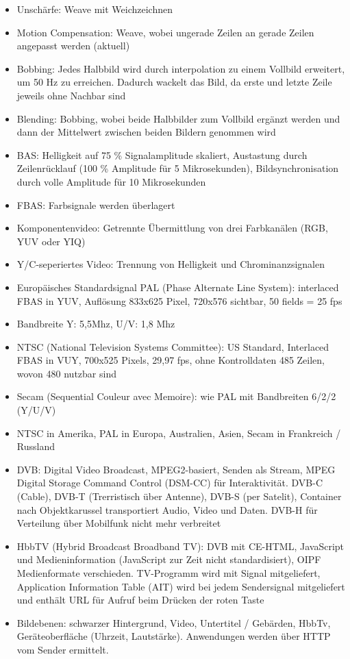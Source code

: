 \documentclass[12pt,landscape]{article}
\begin{document}
\begin{multicols}{3}
\begin{itemize}
\item Unschärfe: Weave mit Weichzeichnen
\item Motion Compensation: Weave, wobei ungerade Zeilen an gerade Zeilen angepasst werden (aktuell)
\item Bobbing: Jedes Halbbild wird durch interpolation zu einem Vollbild erweitert, um 50 Hz zu erreichen. Dadurch wackelt das Bild, da erste und letzte Zeile jeweils ohne Nachbar sind
\item Blending: Bobbing, wobei beide Halbbilder zum Vollbild ergänzt werden und dann der Mittelwert zwischen beiden Bildern genommen wird
\item BAS: Helligkeit auf 75 \% Signalamplitude skaliert, Austastung durch Zeilenrücklauf (100 \% Amplitude für 5 Mikrosekunden), Bildsynchronisation durch volle Amplitude für 10 Mikrosekunden
\item FBAS: Farbsignale werden überlagert
\item Komponentenvideo: Getrennte Übermittlung von drei Farbkanälen (RGB, YUV oder YIQ)
\item Y/C-seperiertes Video: Trennung von Helligkeit und Chrominanzsignalen
\item Europäisches Standardsignal PAL (Phase Alternate Line System): interlaced FBAS in YUV, Auflösung 833x625 Pixel, 720x576 sichtbar, 50 fields = 25 fps
\item Bandbreite Y: 5,5Mhz, U/V: 1,8 Mhz
\item NTSC (National Television Systems Committee): US Standard, Interlaced FBAS in VUY, 700x525 Pixels, 29,97 fps, ohne Kontrolldaten 485 Zeilen, wovon 480 nutzbar sind
\item Secam (Sequential Couleur avec Memoire): wie PAL mit Bandbreiten 6/2/2 (Y/U/V)
\item NTSC in Amerika, PAL in Europa, Australien, Asien, Secam in Frankreich / Russland
\item DVB: Digital Video Broadcast, MPEG2-basiert, Senden als Stream, MPEG Digital Storage Command Control (DSM-CC) für Interaktivität. DVB-C (Cable), DVB-T (Trerristisch über Antenne), DVB-S (per Satelit), Container nach Objektkarussel transportiert Audio, Video und Daten. DVB-H für Verteilung über Mobilfunk nicht mehr verbreitet
\item HbbTV (Hybrid Broadcast Broadband TV): DVB mit CE-HTML, JavaScript und Medieninformation (JavaScript zur Zeit nicht standardisiert), OIPF Medienformate verschieden. TV-Programm wird mit Signal mitgeliefert, Application Information Table (AIT) wird bei jedem Sendersignal mitgeliefert und enthält URL für Aufruf beim Drücken der roten Taste
\item Bildebenen: schwarzer Hintergrund, Video, Untertitel / Gebärden, HbbTv, Geräteoberfläche (Uhrzeit, Lautstärke). Anwendungen werden über HTTP vom Sender ermittelt.
\end{itemize}

\end{multicols}
\end{document}
